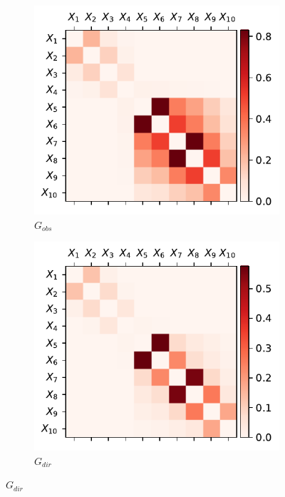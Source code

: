 \documentclass[../Thesis.tex]{subfiles}
\begin{document}
\begin{figure}[H]
    \centering
    \begin{subfigure}[t]{0.49\textwidth}
        \centering
        \includegraphics[width=.95\linewidth]{figures/Gaussian Chain Theoretical/symmetric G obs - MI.pdf}
        \caption{$G_{obs}$}
    \end{subfigure}
    \hfill
    \begin{subfigure}[t]{0.49\textwidth}
        \centering
        \includegraphics[width=.95\linewidth]{figures/Gaussian Chain Theoretical/G dir from symmetric G obs - MI.pdf}
        \caption{$G_{dir}$}

\end{subfigure}
\end{figure}
\end{document}
